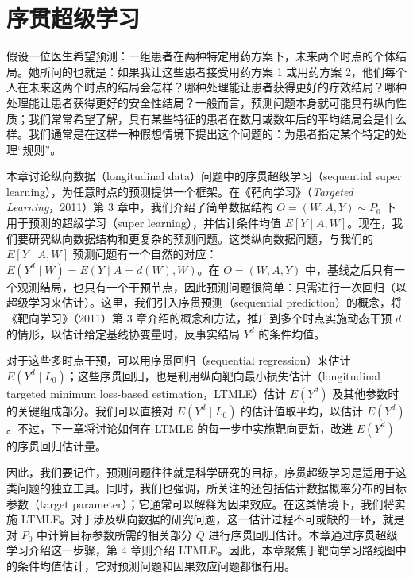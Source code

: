 \chapter{序贯超级学习}
\label{ch:sequential-super-learning}

假设一位医生希望预测：一组患者在两种特定用药方案下，未来两个时点的个体结局。她所问的也就是：如果我让这些患者接受用药方案 1 或用药方案 2，他们每个人在未来这两个时点的结局会怎样？哪种处理能让患者获得更好的疗效结局？哪种处理能让患者获得更好的安全性结局？一般而言，预测问题本身就可能具有纵向性质；我们常常希望了解，具有某些特征的患者在数月或数年后的平均结局会是什么样。我们通常是在这样一种假想情境下提出这个问题的：为患者指定某个特定的处理“规则”。

本章讨论纵向数据（longitudinal data）问题中的序贯超级学习（sequential super learning），为任意时点的预测提供一个框架。在《靶向学习》（\emph{Targeted Learning}，2011）第 3 章中，我们介绍了简单数据结构 $O=(W,A,Y)\sim P_0$ 下用于预测的超级学习（super learning），并估计条件均值 $E[Y\mid A,W]$。现在，我们要研究纵向数据结构和更复杂的预测问题。这类纵向数据问题，与我们的 $E[Y\mid A,W]$ 预测问题有一个自然的对应：$E(Y^d\mid W)=E(Y\mid A=d(W),W)$。在 $O=(W,A,Y)$ 中，基线之后只有一个观测结局，也只有一个干预节点，因此预测问题很简单：只需进行一次回归（以超级学习来估计）。这里，我们引入序贯预测（sequential prediction）的概念，将《靶向学习》（2011）第 3 章介绍的概念和方法，推广到多个时点实施动态干预 $d$ 的情形，以估计给定基线协变量时，反事实结局 $Y^d$ 的条件均值。

对于这些多时点干预，可以用序贯回归（sequential regression）来估计 $E(Y^d\mid L_0)$；这些序贯回归，也是利用纵向靶向最小损失估计（longitudinal targeted minimum loss-based estimation，LTMLE）估计 $E(Y^d)$ 及其他参数时的关键组成部分。我们可以直接对 $E(Y^d\mid L_0)$ 的估计值取平均，以估计 $E(Y^d)$。不过，下一章将讨论如何在 LTMLE 的每一步中实施靶向更新，改进 $E(Y^d)$ 的序贯回归估计量。

因此，我们要记住，预测问题往往就是科学研究的目标，序贯超级学习是适用于这类问题的独立工具。同时，我们也强调，所关注的还包括估计数据概率分布的目标参数（target parameter）；它通常可以解释为因果效应。在这类情境下，我们将实施 LTMLE。对于涉及纵向数据的研究问题，这一估计过程不可或缺的一环，就是对 $P_0$ 中计算目标参数所需的相关部分 $Q$ 进行序贯回归估计。本章通过序贯超级学习介绍这一步骤，第 4 章则介绍 LTMLE。因此，本章聚焦于靶向学习路线图中的条件均值估计，它对预测问题和因果效应问题都很有用。


